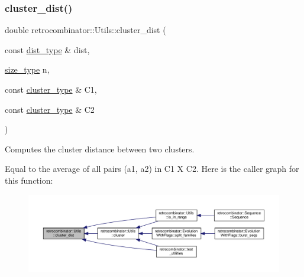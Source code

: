 \subsubsection{\texorpdfstring{cluster\+\_\+dist()}{cluster\_dist()}}
{\footnotesize\ttfamily double retrocombinator\+::\+Utils\+::cluster\+\_\+dist (\begin{DoxyParamCaption}\item[{const \hyperlink{namespaceretrocombinator_aa416b6a3a9e444eae3309a16b8607750}{dist\+\_\+type} \&}]{dist,  }\item[{\hyperlink{namespaceretrocombinator_a8e1541b50cee66a791df4c437ccbb385}{size\+\_\+type}}]{n,  }\item[{const \hyperlink{namespaceretrocombinator_a316667a6633d664fe892bd7e0eb0141e}{cluster\+\_\+type} \&}]{C1,  }\item[{const \hyperlink{namespaceretrocombinator_a316667a6633d664fe892bd7e0eb0141e}{cluster\+\_\+type} \&}]{C2 }\end{DoxyParamCaption})}



Computes the cluster distance between two clusters. 

Equal to the average of all pairs (a1, a2) in C1 X C2. Here is the caller graph for this function\+:
\nopagebreak
\begin{figure}[H]
\begin{center}
\leavevmode
\includegraphics[width=350pt]{namespaceretrocombinator_1_1Utils_a75c34419887242476ac8219dfb981459_icgraph}
\end{center}
\end{figure}
\mbox{\label{namespaceretrocombinator_1_1Utils_a984680ddd6d1f7ccee9e0f040ff16183}} 
